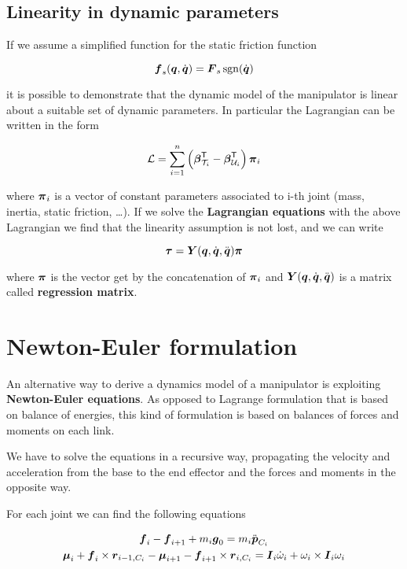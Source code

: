 \subsection{Linearity in dynamic parameters}\label{subsec:linearity-in-dynamic-parameters}

If we assume a simplified function for the static friction function

\[
	\boldsymbol{f}_s(\boldsymbol{q},\dot{\boldsymbol{q}}) = \boldsymbol{F}_s\operatorname{sgn}(\dot{\boldsymbol{q}})
\]

it is possible to demonstrate that the  dynamic model of the manipulator is linear about a suitable set of dynamic parameters.
In particular the Lagrangian can be written in the form

\[
	\mathcal{L} = \sum_{i=1}^n \left( \boldsymbol{\beta}_{\mathcal{T}_i}^{\mathsf{T}} - \boldsymbol{\beta}_{\mathcal{U}_i}^{\mathsf{T}} \right) \boldsymbol{\pi}_i
\]

where $\boldsymbol{\pi}_i$ is a vector of constant parameters associated to i-th joint (mass, inertia, static friction, \dots).
If we solve the \textbf{Lagrangian equations} with the above Lagrangian we find that the linearity assumption is not lost, and we can write

\[
	\boldsymbol{\tau} = \boldsymbol{Y}(\boldsymbol{q},\dot{\boldsymbol{q}},\ddot{\boldsymbol{q}})\boldsymbol{\pi}
\]

where $\boldsymbol{\pi}$ is the vector get by the concatenation of $\boldsymbol{\pi}_i$ and $\boldsymbol{Y}(\boldsymbol{q},\dot{\boldsymbol{q}},\ddot{\boldsymbol{q}})$ is a matrix called \textbf{regression matrix}.


\section{Newton-Euler formulation}

An alternative way to derive a dynamics model of a manipulator is exploiting \textbf{Newton-Euler equations}.
As opposed to Lagrange formulation that is based on balance of energies, this kind of formulation is based on balances of forces and moments on each link.

We have to solve the equations in a recursive way, propagating the velocity and acceleration from the base to the end effector and the forces and moments in the opposite way.

For each joint we can find the following equations

\begin{gather*}
    \boldsymbol{f}_i - \boldsymbol{f}_{i+1} + m_i \boldsymbol{g}_0 = m_i \ddot{\boldsymbol{p}}_{C_i} \\
    \boldsymbol{\mu}_i + \boldsymbol{f}_i \times \boldsymbol{r}_{i-1,C_i} - \boldsymbol{\mu}_{i+1} - \boldsymbol{f}_{i+1} \times \boldsymbol{r}_{i,C_i} = \boldsymbol{I}_i \dot{\omega}_i + \omega_i \times \boldsymbol{I}_i \omega_i
\end{gather*}


